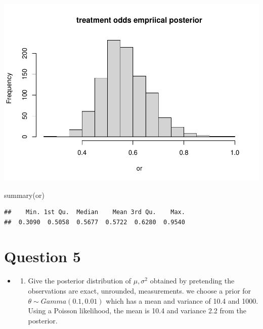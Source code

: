 \documentclass[
]{book}
\newenvironment{Shaded}{\begin{snugshade}}{\end{snugshade}}
\newcommand{\FunctionTok}[1]{\textcolor[rgb]{0.00,0.00,0.00}{#1}}
\newcommand{\NormalTok}[1]{#1}
\providecommand{\tightlist}{%
  \setlength{\itemsep}{0pt}\setlength{\parskip}{0pt}}
\theoremstyle{definition}
\theoremstyle{definition}
\theoremstyle{definition}
\theoremstyle{definition}
\theoremstyle{remark}
\begin{document}
\includegraphics{_main_files/figure-latex/unnamed-chunk-38-2.pdf}

\begin{Shaded}
\begin{Highlighting}[]
  \FunctionTok{summary}\NormalTok{(or)}
\end{Highlighting}
\end{Shaded}

\begin{verbatim}
##    Min. 1st Qu.  Median    Mean 3rd Qu.    Max. 
##  0.3090  0.5058  0.5677  0.5722  0.6280  0.9540
\end{verbatim}

\hypertarget{question-5}{%
\section*{Question 5}\label{question-5}}

\begin{itemize}
\item
  \begin{enumerate}
  \def\labelenumi{(\alph{enumi})}
  \tightlist
  \item
    Give the posterior distribution of \(\mu, \sigma^2\) obtained by pretending the observations are exact, unrounded, measurements. we choose a prior for \(\theta \sim Gamma(0.1,0.01)\) which has a mean and variance of 10.4 and 1000. Using a Poisson likelihood, the mean is 10.4 and variance 2.2 from the posterior.
  \end{enumerate}
\end{itemize}
\end{document}
